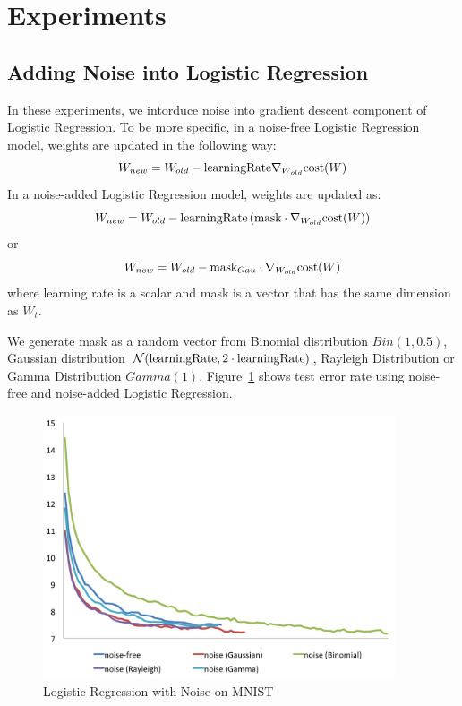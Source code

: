 \section{Experiments}
\label{sec:experiments}


\subsection{Adding Noise into Logistic Regression}
In these experiments, we intorduce noise into gradient descent component
of Logistic Regression.
To be more specific, in a noise-free Logistic Regression model, weights
are updated in the following way:
\[
W_{new} = W_{old} - \text{learningRate} \nabla_{W_{old}} \text{cost}(W)
\]
In a noise-added Logistic Regression model, weights are updated as:
\[
W_{new}=W_{old}-\text{learningRate} \left(\text{mask} \cdot \nabla_{W_{old}}\text{cost}(W) \right)
\]
or
\[
W_{new} = W_{old} - \text{mask}_{Gau} \cdot \nabla_{W_{old}} \text{cost}(W)
\]
where learning rate is a scalar and mask is a vector that has the same dimension as $W_t$.

We generate mask as a random vector from Binomial distribution
$Bin(1,0.5)$, Gaussian distribution $\mathcal{N}(\text{learningRate}, 2 \cdot \text{learningRate})$,
Rayleigh Distribution or Gamma Distribution $Gamma(1)$.
Figure~\ref{logistic} shows test error rate using noise-free and
noise-added Logistic Regression.
\begin{figure}[!htbp]
\centering
\label{logistic}
\caption{Logistic Regression with Noise on MNIST}
\includegraphics[width=295pt]{f-figs/logistic.png}
\end{figure}


